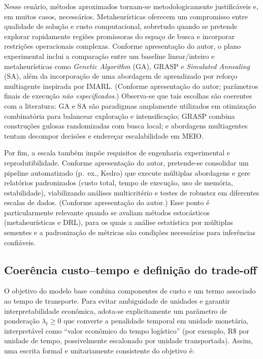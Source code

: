 Nesse cenário, métodos aproximados tornam-se metodologicamente justificáveis e, em muitos casos, necessários. Metaheurísticas oferecem um compromisso entre qualidade de solução e custo computacional, sobretudo quando se pretende explorar rapidamente regiões promissoras do espaço de busca e incorporar restrições operacionais complexas. \cite{Talbi2009Metaheuristics} Conforme apresentação do autor, o plano experimental inclui a comparação entre um baseline linear/inteiro e metaheurísticas como \emph{Genetic Algorithm} (GA), GRASP e \emph{Simulated Annealing} (SA), além da incorporação de uma abordagem de aprendizado por reforço multiagente inspirada por IMARL. (Conforme apresentação do autor; parâmetros finais de execução \emph{não especificados}.) Observa-se que tais escolhas são coerentes com a literatura: GA e SA são paradigmas amplamente utilizados em otimização combinatória para balancear exploração e intensificação; GRASP combina construções gulosas randomizadas com busca local; e abordagens multiagentes tentam decompor decisões e endereçar escalabilidade em MEIO. \cite{Talbi2009Metaheuristics,Ziegner2025IMARL,Geevers2024MEIODRL}

Por fim, a escala também impõe requisitos de engenharia experimental e reprodutibilidade. Conforme apresentação do autor, pretende-se consolidar um pipeline automatizado (p.\ ex., Kedro) que execute múltiplas abordagens e gere relatórios padronizados (custo total, tempo de execução, uso de memória, estabilidade), viabilizando análises multicritério e testes de robustez em diferentes escalas de dados. (Conforme apresentação do autor.) Esse ponto é particularmente relevante quando se avaliam métodos estocásticos (metaheurísticas e DRL), para os quais a análise estatística por múltiplas sementes e a padronização de métricas são condições necessárias para inferências confiáveis. \cite{Law2015SimulationModeling,Boute2022DRLInventoryRoadmap}

\subsection{Coerência custo--tempo e definição do trade-off}

O objetivo do modelo base combina componentes de custo e um termo associado ao tempo de transporte. Para evitar ambiguidade de unidades e garantir interpretabilidade econômica, adota-se explicitamente um parâmetro de ponderação \(\lambda_t \ge 0\) que converte a penalidade temporal em unidade monetária, interpretável como ``valor econômico do tempo logístico'' (por exemplo, \(\mathrm{R\$}\) por unidade de tempo, possivelmente escalonado por unidade transportada). Assim, uma escrita formal e unitariamente consistente do objetivo é:

